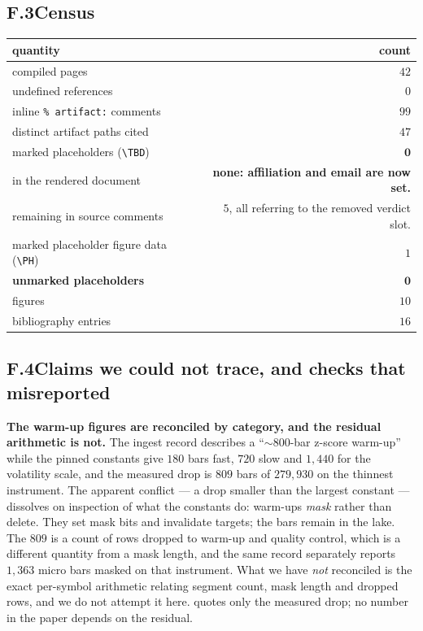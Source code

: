 \subsection*{F.3\quad Census}

\begin{center}
\begin{tabular}{lr}
\toprule
quantity & count \\
\midrule
compiled pages & $42$ \\
undefined references & $0$ \\
inline \texttt{\% artifact:} comments & $99$ \\
distinct artifact paths cited & $47$ \\
marked placeholders (\texttt{\textbackslash TBD}) & $\mathbf{0}$ \\
\quad in the rendered document & \textbf{none: affiliation and email are now set.} \\
\quad remaining in source comments & $5$, all referring to the removed verdict slot. \\
marked placeholder figure data (\texttt{\textbackslash PH}) & $1$ \\
\textbf{unmarked placeholders} & $\mathbf{0}$ \\
figures & $10$ \\
bibliography entries & $16$ \\
\bottomrule
\end{tabular}
\end{center}

\subsection*{F.4\quad Claims we could not trace, and checks that misreported}

\textbf{The warm-up figures are reconciled by category, and the residual arithmetic is not.} The
ingest record describes a ``$\sim$800-bar z-score warm-up'' while the pinned constants give $180$
bars fast, $720$ slow and $1{,}440$ for the volatility scale, and the measured drop is $809$ bars
of $279{,}930$ on the thinnest instrument. The apparent conflict --- a drop smaller than the
largest constant --- dissolves on inspection of what the constants do: warm-ups \emph{mask} rather
than delete. They set mask bits and invalidate targets; the bars remain in the lake. The $809$ is a
count of rows dropped to warm-up and quality control, which is a different quantity from a mask
length, and the same record separately reports $1{,}363$ micro bars masked on that instrument. What
we have \emph{not} reconciled is the exact per-symbol arithmetic relating segment count, mask
length and dropped rows, and we do not attempt it here.  quotes only the
measured drop; no number in the paper depends on the residual.

